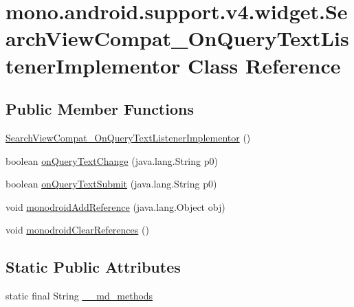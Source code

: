 \hypertarget{classmono_1_1android_1_1support_1_1v4_1_1widget_1_1_search_view_compat___on_query_text_listener_implementor}{
\section{mono.android.support.v4.widget.SearchViewCompat\_\-OnQueryTextListenerImplementor Class Reference}
\label{classmono_1_1android_1_1support_1_1v4_1_1widget_1_1_search_view_compat___on_query_text_listener_implementor}
}
\subsection*{Public Member Functions}
\begin{CompactItemize}
\item 
\hyperlink{classmono_1_1android_1_1support_1_1v4_1_1widget_1_1_search_view_compat___on_query_text_listener_implementor_c42b749afeccc410879ee6a7b3e14c9b}{SearchViewCompat\_\-OnQueryTextListenerImplementor} ()
\item 
boolean \hyperlink{classmono_1_1android_1_1support_1_1v4_1_1widget_1_1_search_view_compat___on_query_text_listener_implementor_b8fee074b4e5cd25e89530fb9b0b0555}{onQueryTextChange} (java.lang.String p0)
\item 
boolean \hyperlink{classmono_1_1android_1_1support_1_1v4_1_1widget_1_1_search_view_compat___on_query_text_listener_implementor_ac43472a20a0f22e6d916a21a2b5b441}{onQueryTextSubmit} (java.lang.String p0)
\item 
void \hyperlink{classmono_1_1android_1_1support_1_1v4_1_1widget_1_1_search_view_compat___on_query_text_listener_implementor_b269c35f2099e9002b7d070b1edb3563}{monodroidAddReference} (java.lang.Object obj)
\item 
void \hyperlink{classmono_1_1android_1_1support_1_1v4_1_1widget_1_1_search_view_compat___on_query_text_listener_implementor_d551bcae3b9a0c0b5edc40648f2e8060}{monodroidClearReferences} ()
\end{CompactItemize}
\subsection*{Static Public Attributes}
\begin{CompactItemize}
\item 
static final String \hyperlink{classmono_1_1android_1_1support_1_1v4_1_1widget_1_1_search_view_compat___on_query_text_listener_implementor_289af45f7839502b7628f226984a6620}{\_\-\_\-md\_\-methods}
\end{CompactItemize}
